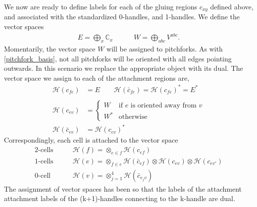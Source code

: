 \documentclass[12pt,a4paper]{article}
\newcommand{\tp}{\otimes}
\newcommand{\cc}{\mathbb{C}}
\newcommand{\mch}{\mathcal{H}}
\begin{document}
We now are ready to define labels for each of the gluing regions $c_{xy}$ defined above, 
and associated with the standardized 0-handles, and 1-handles. 
We define the vector spaces 
\begin{align}
E = \bigoplus_{x} \cc_x \quad \quad \quad W = \bigoplus_{abc}V^{abc}.
\end{align}
Momentarily, the vector space $W$ will be assigned to pitchforks.
As with \eqref{pitchfork_basis}, not all pitchforks will be oriented with all edges pointing outwards. 
In this scenario we replace the appropriate object with its dual.
The vector space we assign to each of the attachment regions are,
\begin{align}
  \mch(c_{fe}) &= E \quad \quad \mch(\bar{c}_{fe}) = \mch(c_{fe})^* = E^*\\
  \\
\mch(c_{ev} )&= \begin{cases} W &\text{if $e$ is oriented away from $v$} \\
W^* &\text{otherwise} 
\end{cases}\\
\mch(\bar{c}_{ev}) &= \mch(c_{ev})^*
\end{align}
Correspondingly, each cell is attached to the vector space 
\begin{align}
\label{tensor_space}
\text{2-cells} \quad \quad  & \mch(f) = \tp_{e \in f} \mch(c_{ef})  \\
\text{1-cells}\quad \quad   & \mch(e) = \tp_{f \in e}\mch (\bar{c}_{ef}) \tp \mch(c_{ev}) \tp \mch (c_{ev'}) \\
 \text{0-cell} \quad \quad  & \mch(v) = \tp_{j =1}^4\mch(\bar{c}_{e_jv}) 
\end{align}
The assignment of vector spaces has been so that the labels of the attachment attachment labels of the (k+1)-handles connecting to the k-handle are dual.
\end{document}
